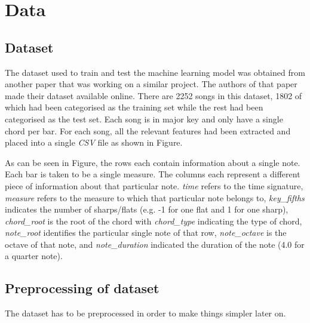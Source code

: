 \documentclass[11pt]{article}
\begin{document}

\section{Data}

\subsection{Dataset}
The dataset \cite{dataset} used to train and test the machine learning model was obtained from another paper \cite{dataset_paper} that was working on a similar project. The authors of that paper made their dataset available online. There are 2252 songs in this dataset, 1802 of which had been categorised as the training set while the rest had been categorised as the test set. Each song is in major key and only have a single chord per bar. For each song, all the relevant features had been extracted and placed into a single \emph{CSV} file as shown in Figure.

As can be seen in Figure, the rows each contain information about a single note. Each bar is taken to be a single measure. The columns each represent a different piece of information about that particular note. \emph{time} refers to the time signature, \emph{measure} refers to the measure to which that particular note belongs to, \emph{key\_fifths} indicates the number of sharps/flats (e.g. -1 for one flat and 1 for one sharp), \emph{chord\_root} is the root of the chord with \emph{chord\_type} indicating the type of chord, \emph{note\_root} identifies the particular single note of that row, \emph{note\_octave} is the octave of that note, and \emph{note\_duration} indicated the duration of the note (4.0 for a quarter note).

\subsection{Preprocessing of dataset}
The dataset has to be preprocessed in order to make things simpler later on.
\end{document}
